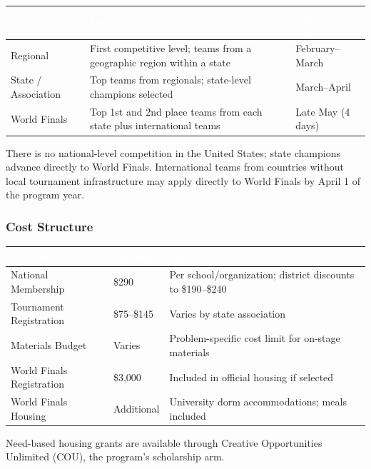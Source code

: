 \documentclass[11pt,letterpaper]{article}
\newcommand{\tableheader}[1]{\textbf{\sffamily\textcolor{white}{#1}}}
\begin{document}
\begin{center}
\begin{tabularx}{\textwidth}{L{3cm}XL{3cm}}
\toprule
{}
\tableheader{Level} & \tableheader{Description} & \tableheader{Typical Timing} \\
\midrule
Regional & First competitive level; teams from a geographic region within a state & February--March \\
State / Association & Top teams from regionals; state-level champions selected & March--April \\
World Finals & Top 1st and 2nd place teams from each state plus international teams & Late May (4 days) \\
\bottomrule
\end{tabularx}
\end{center}

There is no national-level competition in the United States; state champions advance directly to World Finals. International teams from countries without local tournament infrastructure may apply directly to World Finals by April 1 of the program year.

\subsubsection{Cost Structure}

\begin{center}
\begin{tabularx}{\textwidth}{L{4cm}C{2.5cm}X}
\toprule
{}
\tableheader{Cost Item} & \tableheader{Amount} & \tableheader{Notes} \\
\midrule
National Membership & \$290 & Per school/organization; district discounts to \$190--\$240 \\
Tournament Registration & \$75--\$145 & Varies by state association \\
Materials Budget & Varies & Problem-specific cost limit for on-stage materials \\
World Finals Registration & \$3,000 & Included in official housing if selected \\
World Finals Housing & Additional & University dorm accommodations; meals included \\
\bottomrule
\end{tabularx}
\end{center}

Need-based housing grants are available through Creative Opportunities Unlimited (COU), the program's scholarship arm.
\end{document}
